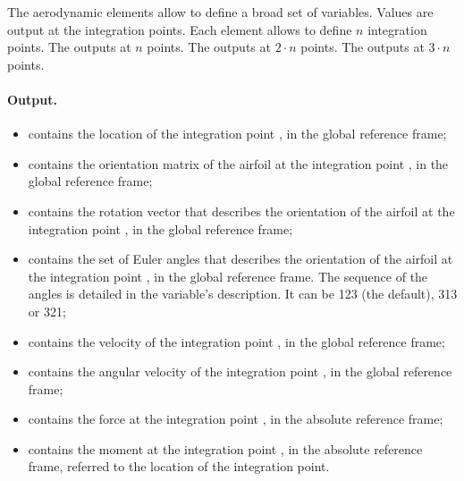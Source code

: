 The aerodynamic elements allow to define a broad set of variables.
Values are output at the integration points.
Each element allows to define $n$ integration points.
The  outputs at $n$ points.
The  outputs at $2 \cdot n$ points.
The  outputs at $3 \cdot n$ points.

\paragraph{Output.}
\begin{itemize}
\item {} contains the location
of the integration point , in the global reference frame;

\item {} contains the orientation matrix
of the airfoil at the integration point , in the global reference frame;

\item {} contains the rotation vector
that describes the orientation of the airfoil at the integration point ,
in the global reference frame;

\item {} contains the set of Euler angles
that describes the orientation of the airfoil at the integration point ,
in the global reference frame.
The sequence of the angles is detailed in the variable's description.
It can be 123 (the default), 313 or 321;

\item {} contains the velocity
of the integration point , in the global reference frame;

\item {} contains the angular velocity
of the integration point , in the global reference frame;

\item {} contains the force
at the integration point , in the absolute reference frame;

\item {} contains the moment
at the integration point , in the absolute reference frame,
referred to the location of the integration point.
\end{itemize}

